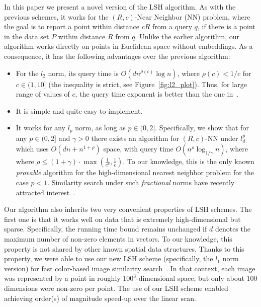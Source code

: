 \documentclass[12pt]{article}
\begin{document}
In this paper we present a novel version of the LSH algorithm.
As with the previous schemes, it works for the $(R,c)$-Near Neighbor (NN) problem, where the goal is to report a point within distance $cR$ from a query $q$, if there is a point in the data set $P$ within distance $R$ from $q$.
Unlike the earlier algorithm, our algorithm works directly on points in Euclidean space without embeddings. 
As a consequence, it has the following advantages over the previous algorithm:
\begin{itemize}
\item For the $l_2$ norm, its query time is $O(d n^{\rho(c)}
\log n)$, where $\rho(c)<1/c$  for $c \in (1,10]$ (the inequality is strict, see
Figure~\ref{fig:l2_plot}). Thus, for large range of values of $c$, the query time exponent is better than the one in~\cite{IM,GIM}.
\item It is simple and quite easy to implement.
\item It works for any $l_p$ norm, as long as $p \in (0,2]$. Specifically, we show that for any $p \in (0,2]$ and $\gamma>0$ there exists an algorithm for $(R,c)$-NN under $l_d^p$
which uses  $O(d n +  n^{1+\rho})$ space, with query time 
$O(n^{\rho} \log_{1/\gamma} n)$, where where $\rho\le (1+\gamma)\cdot\max\left(\frac{1}{c^p}, \frac{1}{c}\right)$.
To our knowledge, this is the only known {\em provable} algorithm for the high-dimensional nearest neighbor problem for the case $p<1$.
Similarity search under such {\em fractional} norms have recently attracted interest~\cite{AHK,CIKM}.
\end{itemize}


Our algorithm also inherits two very convenient properties of LSH schemes.
The first one is that it works well on data that is extremely high-dimensional but sparse.
Specifically, the running time bound remains unchanged if $d$ denotes the maximum number of  non-zero elements in vectors.
To our knowledge, this property is not shared by other known spatial data structures.
Thanks to this property, we were able to use our new LSH scheme (specifically, the $l_1$ norm version) for fast color-based image similarity search~\cite{IT}.
In that context, each image was represented by a point in roughly $100^3$-dimensional space, but only about 100 dimensions were non-zero per point.
The use of our LSH scheme enabled achieving order(s) of magnitude speed-up over the linear scan.
\end{document}
